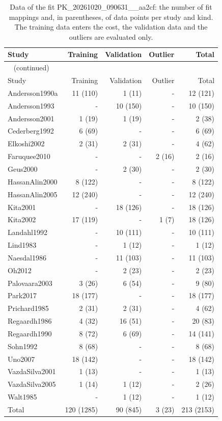 \begin{longtable}{lrrrr}
\caption{Data of the fit PK\_20261020\_090631\_\_aa2cf: the number of fit mappings and, in parentheses, of data points per study and kind. The training data enters the cost, the validation data and the outliers are evaluated only.}\label{tab:data:PK_20261020_090631__aa2cf} \\
\toprule
Study & Training & Validation & Outlier & Total \\
\midrule
\endfirsthead
\multicolumn{5}{l}{\small\tablename~\thetable{} (continued)} \\
\toprule
Study & Training & Validation & Outlier & Total \\
\midrule
\endhead
\bottomrule
\endlastfoot
Andersson1990a & 11 (110) & 1 (11) & - & 12 (121) \\
Andersson1993 & - & 10 (150) & - & 10 (150) \\
Andersson2001 & 1 (19) & 1 (19) & - & 2 (38) \\
Cederberg1992 & 6 (69) & - & - & 6 (69) \\
Elkoshi2002 & 2 (31) & 2 (31) & - & 4 (62) \\
Faruquee2010 & - & - & 2 (16) & 2 (16) \\
Geus2000 & - & 2 (30) & - & 2 (30) \\
HassanAlin2000 & 8 (122) & - & - & 8 (122) \\
HassanAlin2005 & 12 (240) & - & - & 12 (240) \\
Kita2001 & - & 18 (126) & - & 18 (126) \\
Kita2002 & 17 (119) & - & 1 (7) & 18 (126) \\
Landahl1992 & - & 10 (111) & - & 10 (111) \\
Lind1983 & - & 1 (12) & - & 1 (12) \\
Naesdal1986 & - & 11 (103) & - & 11 (103) \\
Oh2012 & - & 2 (23) & - & 2 (23) \\
Palovaara2003 & 3 (26) & 6 (54) & - & 9 (80) \\
Park2017 & 18 (177) & - & - & 18 (177) \\
Prichard1985 & 2 (31) & 2 (31) & - & 4 (62) \\
Regaardh1986 & 4 (32) & 16 (51) & - & 20 (83) \\
Regaardh1990 & 8 (72) & 6 (69) & - & 14 (141) \\
Sohn1992 & 8 (68) & - & - & 8 (68) \\
Uno2007 & 18 (142) & - & - & 18 (142) \\
VazdaSilva2001 & 1 (13) & - & - & 1 (13) \\
VazdaSilva2005 & 1 (14) & 1 (12) & - & 2 (26) \\
Walt1985 & - & 1 (12) & - & 1 (12) \\
Total & 120 (1285) & 90 (845) & 3 (23) & 213 (2153) \\
\end{longtable}

